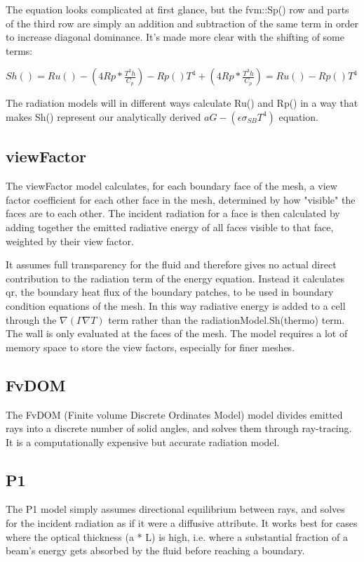 The equation looks complicated at first glance, but the fvm::Sp() row and parts of the third row are simply an addition and subtraction of the same term in order to increase diagonal dominance. It's made more clear with the shifting of some terms:

$Sh() = Ru() - (4Rp*\frac{T^3h}{C_p}) - Rp()T^4 + (4Rp*\frac{T^3h}{C_p}) = Ru() - Rp()T^4$

The radiation models will in different ways calculate Ru() and Rp() in a way that makes Sh() represent our analytically derived $aG-(\epsilon \sigma_{SB}T^4)$ equation.

\subsection{viewFactor}

The viewFactor model calculates, for each boundary face of the mesh, a view factor coefficient for each other face in the mesh, determined by how "visible" the faces are to each other. The incident radiation for a face is then calculated by adding together the emitted radiative energy of all faces visible to that face, weighted by their view factor.

It assumes full transparency for the fluid and therefore gives no actual direct contribution to the radiation term of the energy equation. Instead it calculates qr, the boundary heat flux of the boundary patches, to be used in boundary condition equations of the mesh. In this way radiative energy is added to a cell through the $\nabla (\Gamma \nabla T)$ term rather than the radiationModel.Sh(thermo) term. The wall is only evaluated at the faces of the mesh. The model requires a lot of memory space to store the view factors, especially for finer meshes.

\subsection{FvDOM}

The FvDOM (Finite volume Discrete Ordinates Model) model divides emitted rays into a discrete number of solid angles, and solves them through ray-tracing. It is a computationally expensive but accurate radiation model.

\subsection{P1}

The P1 model simply assumes directional equilibrium between rays, and solves for the incident radiation as if it were a diffusive attribute. It works best for cases where the optical thickness (a * L) is high, i.e. where a substantial fraction of a beam's energy gets absorbed by the fluid before reaching a boundary.

